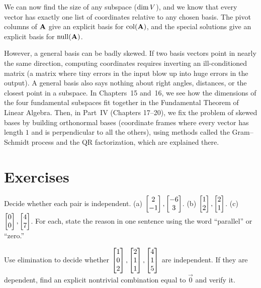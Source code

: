 \begin{connectionbox}
We can now find the size of any subspace ($\operatorname{dim} V$), and we know that every vector has exactly one list of coordinates relative to any chosen basis. The pivot columns of $\mathbf{A}$ give an explicit basis for $\operatorname{col}(\mathbf{A})$, and the special solutions give an explicit basis for $\operatorname{null}(\mathbf{A})$.

However, a general basis can be badly skewed. If two basis vectors point in nearly the same direction, computing coordinates requires inverting an ill-conditioned matrix (a matrix where tiny errors in the input blow up into huge errors in the output). A general basis also says nothing about right angles, distances, or the closest point in a subspace. In Chapters~15 and~16, we see how the dimensions of the four fundamental subspaces fit together in the Fundamental Theorem of Linear Algebra. Then, in Part~IV (Chapters 17--20), we fix the problem of skewed bases by building orthonormal bases (coordinate frames where every vector has length $1$ and is perpendicular to all the others), using methods called the Gram--Schmidt process and the QR factorization, which are explained there.
\end{connectionbox}

\section*{Exercises}

\begin{exercise}
\label{ch14:exr-parallel}
Decide whether each pair is independent. (a) $\begin{bmatrix}2\\-1\end{bmatrix},\begin{bmatrix}-6\\3\end{bmatrix}$.
(b) $\begin{bmatrix}1\\2\end{bmatrix},\begin{bmatrix}2\\1\end{bmatrix}$. (c) $\begin{bmatrix}0\\0\end{bmatrix},\begin{bmatrix}4\\7\end{bmatrix}$. For each,
state the reason in one sentence using the word ``parallel'' or ``zero.''
\end{exercise}

\begin{exercise}
\label{ch14:exr-test}
Use elimination to decide whether $\begin{bmatrix}1\\0\\2\end{bmatrix},\begin{bmatrix}2\\1\\1\end{bmatrix},
\begin{bmatrix}4\\1\\5\end{bmatrix}$ are independent. If they are dependent, find an explicit
nontrivial combination equal to $\vec{0}$ and verify it.
\end{exercise}

